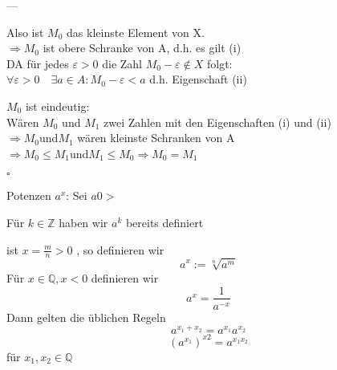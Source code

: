 \documentclass[12pt,a4paper]{article}
\begin{document}
---


Also ist $M_{0}$ das kleinste Element von X.\\

$\Rightarrow M_{0}$ ist obere Schranke von A, d.h. es gilt (i)\\

DA für jedes $\varepsilon > 0$  die Zahl $M_{0}-\varepsilon\notin X $ folgt:\\

$\forall \varepsilon >0 \quad \exists a \in A :M_{0}-\varepsilon <a$ d.h. Eigenschaft (ii)

$M_{0}$ ist eindeutig:\\

Wären $M_{0}$ und $M_{1}$ zwei Zahlen mit den Eigenschaften (i) und (ii)\\

$\Rightarrow M_{0} $und$ M_{1}$ wären kleinste Schranken von A\\

$\Rightarrow M_{0} \leq M_{1}$und$M_{1}\leq M_{0}\Rightarrow M_{0}=M_{1}$
\begin{flushright}$ \square $ \end{flushright}

Potenzen $a^{x}$: Sei $a0>$

Für $k\in \mathbb{Z}$ haben wir $a^{k}$ bereits definiert

ist $x=\frac{m}{n}>0$ , so definieren wir 
$$a^{x}:=\sqrt[n]{a^{m}}$$
Für $x\in \mathbb{Q},x<0$ definieren wir
$$a^{x}=\frac{1}{a^{-x}}$$
Dann gelten die üblichen Regeln 
$$a^{x_{1}+x_{2}}=a^{x_{1}}a^{x_{2}}$$
$$(a^{x_{1}})^{x2}=a^{x_{1}x_{2}}$$
für $x_{1},x_{2} \in \mathbb{Q}$   
 
\end{document}
